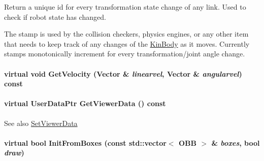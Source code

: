 Return a unique id for every transformation state change of any link. Used to check if robot state has changed. 

The stamp is used by the collision checkers, physics engines, or any other item that needs to keep track of any changes of the \hyperlink{classOpenRAVE_1_1KinBody}{KinBody} as it moves. Currently stamps monotonically increment for every transformation/joint angle change. \hypertarget{classOpenRAVE_1_1KinBody_a7685100461fe38707668dc3495e05a49}{
\paragraph[{GetVelocity}]{\setlength{\rightskip}{0pt plus 5cm}virtual void GetVelocity (Vector \& {\em linearvel}, \/  Vector \& {\em angularvel}) const}\hfill}
\label{classOpenRAVE_1_1KinBody_a7685100461fe38707668dc3495e05a49}
\hypertarget{classOpenRAVE_1_1KinBody_afb0f7064845ec4978785c8973be539ee}{
\paragraph[{GetViewerData}]{\setlength{\rightskip}{0pt plus 5cm}virtual UserDataPtr GetViewerData () const}\hfill}
\label{classOpenRAVE_1_1KinBody_afb0f7064845ec4978785c8973be539ee}
\begin{DoxySeeAlso}{See also}
\hyperlink{classOpenRAVE_1_1KinBody_aa8a85e0f120e9cbc588a8f3a555758cb}{SetViewerData} 
\end{DoxySeeAlso}
\hypertarget{classOpenRAVE_1_1KinBody_a904bbbd6da53247d7f8e3ce1c3bac5b8}{
\paragraph[{InitFromBoxes}]{\setlength{\rightskip}{0pt plus 5cm}virtual bool InitFromBoxes (const std::vector$<$ {\bf OBB} $>$ \& {\em boxes}, \/  bool {\em draw})}\hfill}
\label{classOpenRAVE_1_1KinBody_a904bbbd6da53247d7f8e3ce1c3bac5b8}


